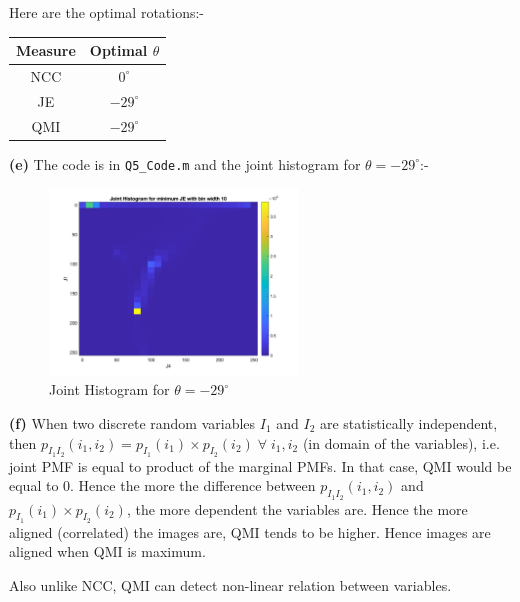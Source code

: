 \documentclass[12pt]{article}
\begin{document}
\vspace{-10pt}

Here are the optimal rotations:-

\vspace{-10pt}

\begin{table}[H]
    \centering
    \begin{tabular}{|c|c|}
        \hline
        Measure & Optimal $\theta$ \\
        \hline
        NCC & $0^{\circ}$ \\
        JE & $-29^{\circ}$ \\
        QMI & $-29^{\circ}$ \\
        \hline
    \end{tabular}
\end{table}

\vspace{-10pt}

\textbf{(e)} The code is in \texttt{Q5\_Code.m} and the joint histogram for $\theta = -29^{\circ}$:-

\vspace{-13pt}

\begin{figure}[H]
    \centering
    \includegraphics[width=0.59\textwidth]{Joint_hist_JE.png}
    \vspace{-10pt}
    \caption{Joint Histogram for $\theta = -29^{\circ}$}
\end{figure}

\vspace{-10pt}

\textbf{(f)} When two discrete random variables $I_1$ and $I_2$ are statistically independent, then $p_{I_1 I_2}(i_1,i_2)=p_{I_1}(i_1) \times p_{I_2}(i_2) \; \forall \; i_1, i_2$ (in domain of the variables), i.e. joint PMF is equal to product of the marginal PMFs. In that case, QMI would be equal to $0$. Hence the more the difference between $p_{I_1 I_2}(i_1,i_2)$ and $p_{I_1}(i_1) \times p_{I_2}(i_2)$, the more dependent the variables are. Hence the more aligned (correlated) the images are, QMI tends to be higher. Hence images are aligned when QMI is maximum.

Also unlike NCC, QMI can detect non-linear relation between variables.
\end{document}
